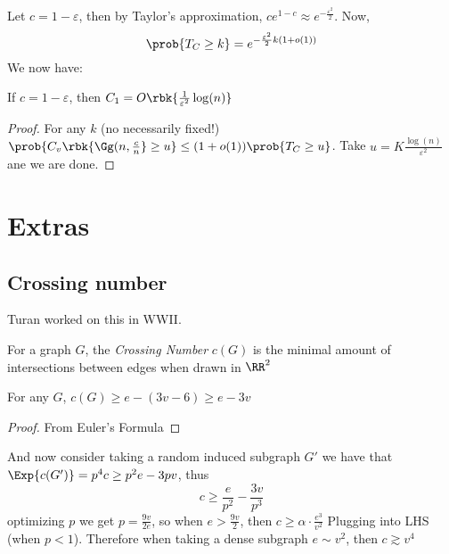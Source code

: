 \documentclass[a4paper, 11pt, oneside]{book}
\begin{document}
	Let $c = 1-\varepsilon$, then by Taylor's approximation, $ce^{1-c}\approx e^{-\frac{\varepsilon^2}{2}}$. Now,
	\[
	\prob{T_C \ge k} =e^{-\frac{\varepsilon^2}{2}k(1+o(1))}
	\]
	We now have:
	\begin{claim}
		If $c = 1-\varepsilon$, then $C_1 = O\rbk{\frac{1}{\varepsilon^2}\log(n)}$
	\end{claim}
	\begin{proof} For any $k$ (no necessarily fixed!)
		$\prob{C_v\rbk{\Gg(n,\frac{c}{n}}\ge u}\le (1+o(1)) \prob{T_C \ge u}$. Take $u = K\frac{\log(n)}{\varepsilon^2}$ ane we are done.
	\end{proof}
	\appendix
\chapter{Extras}
\section{Crossing number}
Turan worked on this in WWII.

\begin{defn}
	 For a graph $G$, the \emph{Crossing Number} $c(G)$ is the minimal amount of intersections between edges when drawn in $\RR^2$
\end{defn}
\begin{claim}
	For any $G$, $c(G) \ge e-(3v-6) \ge e-3v$
\end{claim}
\begin{proof}
	From Euler's Formula
\end{proof}
And now consider taking a random induced subgraph $G'$ we have that $\Exp{c(G')} = p^4c\ge p^2e - 3pv$, thus
	\[
	c\ge \frac{e}{p^2}-\frac{3v}{p^3}
	\]
optimizing $p$ we get $p = \frac{9v}{2e}$, so when $e > \frac{9v}{2}$, then $c \ge \alpha\cdot \frac{e^3}{v^2}$ Plugging into LHS (when $p<1$). Therefore when taking a dense subgraph $e\sim v^2$, then $c\gtrsim v^4$
\end{document}
